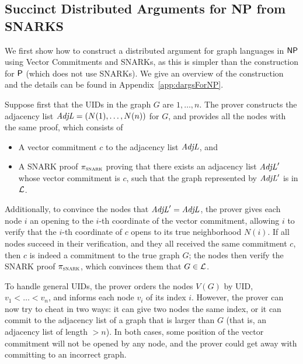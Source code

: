 \subsection{Succinct Distributed Arguments for NP from SNARKS}\label{sec:dargsForNP}
We first show how to construct a distributed argument for graph languages in ${\mathsf{NP}}$ using Vector Commitments and SNARKs,
as this is simpler than the construction for ${\mathsf{P}}$ (which does not use SNARKs).
We give an overview of the construction and the details
can be found in Appendix~\ref{app:dargsForNP}.


Suppose first that the UIDs in the graph $G$ are $1,\ldots,n$.
The prover constructs the adjacency list $\mathit{ AdjL } = (N(1),\ldots,N(n))$ for $G$,
and
provides all the nodes with the same proof, which consists of
\begin{itemize}
	\item A vector commitment $c$ to the adjacency list $\mathit{ AdjL }$, and
        \item A SNARK proof $\pi_\textsc{snark}$ proving that there exists an adjacency list $\mathit{ AdjL }'$ whose vector commitment is $c$, such that the graph represented by $\mathit{ AdjL }'$ is in $\mathcal{L}$.
\end{itemize}
Additionally, to convince the nodes that $\mathit{ AdjL }' = \mathit{ AdjL }$,
the prover gives each node $i$ an opening to the $i$-th coordinate of the vector commitment, allowing $i$ to verify that the $i$-th coordinate of $c$ opens to its true neighborhood $N(i)$.
If all nodes succeed in their verification, and they all received the same commitment $c$, then $c$ is indeed a commitment to the true graph $G$; the nodes then verify the SNARK proof $\pi_\textsc{snark}$, which convinces them that $G \in \mathcal{L}$.

To handle general UIDs, the prover orders the nodes $V(G)$ by UID, $v_1 < \ldots < v_n$,
and informs each node $v_i$ of its index $i$.
However, the prover can now try to cheat in two ways:
it can give two nodes the same index, or it can commit to the adjacency list of a graph that is
larger than $G$ (that is, an adjacency list of length $> n$).
In both cases, some position of the vector commitment will not be opened by any node,
and the prover could get away with committing to an incorrect graph.

